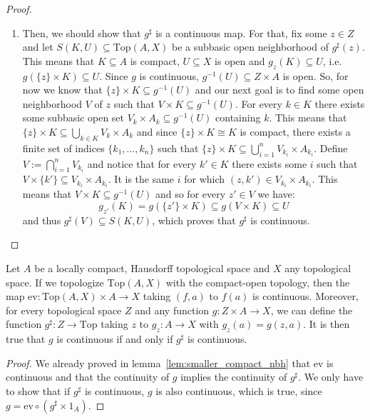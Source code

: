 \begin{proof}
\begin{enumerate}
\begin{enumerate}
\item Then, we should show that $g^{\sharp}$ is a continuous map. For that, fix some $z\in Z$ and let $S(K,U)\subseteq\mathrm{Top}(A,X)$ be a subbasic open neighborhood of $g^{\sharp}(z)$. This means that $K\subseteq A$ is compact, $U\subseteq X$ is open and $g_z(K)\subseteq U$, i.e. $g(\{z\}\times K)\subseteq U$. Since $g$ is continuous, $g^{-1}(U)\subseteq Z\times A$ is open. So, for now we know that $\{z\}\times K\subseteq g^{-1}(U)$ and our next goal is to find some open neighborhood $V$ of $z$ such that $V\times K\subseteq g^{-1}(U)$. For every $k\in K$ there exists some subbasic open set $V_k\times A_k\subseteq g^{-1}(U)$ containing $k$. This means that $\{z\}\times K\subseteq\bigcup_{k\in K}V_k\times A_k$ and since $\{z\}\times K\cong K$ is compact, there exists a finite set of indices $\{k_1,\ldots,k_n\}$ such that $\{z\}\times K\subseteq\bigcup_{i=1}^nV_{k_i}\times A_{k_i}$. Define $V:=\bigcap_{i=1}^nV_{k_i}$ and notice that for every $k'\in K$ there exists some $i$ such that $V\times\{k'\}\subseteq V_{k_i}\times A_{k_i}$. It is the same $i$ for which $(z,k')\in V_{k_i}\times A_{k_i}$. This means that $V\times K\subseteq g^{-1}(U)$ and so for every $z'\in V$ we have:
\[g_{z'}(K)=g(\{z'\}\times K)\subseteq g(V\times K)\subseteq U\]
and thus $g^{\sharp}(V)\subseteq S(K,U)$, which proves that $g^{\sharp}$ is continuous.\qedhere
\end{enumerate}
\end{enumerate}
\end{proof}

\begin{corollary}\label{cor:exp_obj_prop} Let $A$ be a locally compact, Hausdorff topological space and $X$ any topological space. If we topologize $\mathrm{Top}(A,X)$ with the compact-open topology, then the map $\mathrm{ev}:\mathrm{Top}(A,X)\times A\to X$ taking $(f,a)$ to $f(a)$ is continuous. Moreover, for every topological space $Z$ and any function $g:Z\times A\to X$, we can define the function $g^{\sharp}:Z\to\mathrm{Top}$ taking $z$ to $g_z:A\to X$ with $g_z(a)=g(z,a)$. It is then true that $g$ is continuous if and only if $g^{\sharp}$ is continuous.
\end{corollary}
\begin{proof} We already proved in lemma~\ref{lem:smaller_compact_nbh} that $\mathrm{ev}$ is continuous and that the continuity of $g$ implies the continuity of $g^{\sharp}$. We only have to show that if $g^{\sharp}$ is continuous, $g$ is also continuous, which is true, since $g=\mathrm{ev}\circ(g^{\sharp}\times1_A)$.
\end{proof}

